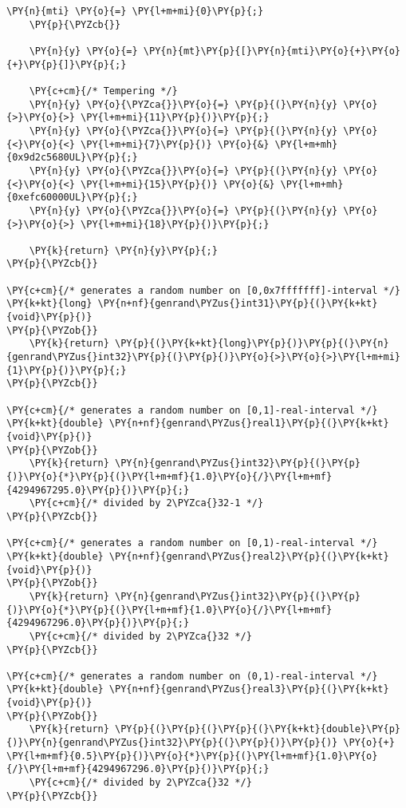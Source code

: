 \begin{Verbatim}[commandchars=\\\{\}]
		\PY{n}{mti} \PY{o}{=} \PY{l+m+mi}{0}\PY{p}{;}
	\PY{p}{\PYZcb{}}
  
	\PY{n}{y} \PY{o}{=} \PY{n}{mt}\PY{p}{[}\PY{n}{mti}\PY{o}{+}\PY{o}{+}\PY{p}{]}\PY{p}{;}

	\PY{c+cm}{/* Tempering */}
	\PY{n}{y} \PY{o}{\PYZca{}}\PY{o}{=} \PY{p}{(}\PY{n}{y} \PY{o}{>}\PY{o}{>} \PY{l+m+mi}{11}\PY{p}{)}\PY{p}{;}
	\PY{n}{y} \PY{o}{\PYZca{}}\PY{o}{=} \PY{p}{(}\PY{n}{y} \PY{o}{<}\PY{o}{<} \PY{l+m+mi}{7}\PY{p}{)} \PY{o}{&} \PY{l+m+mh}{0x9d2c5680UL}\PY{p}{;}
	\PY{n}{y} \PY{o}{\PYZca{}}\PY{o}{=} \PY{p}{(}\PY{n}{y} \PY{o}{<}\PY{o}{<} \PY{l+m+mi}{15}\PY{p}{)} \PY{o}{&} \PY{l+m+mh}{0xefc60000UL}\PY{p}{;}
	\PY{n}{y} \PY{o}{\PYZca{}}\PY{o}{=} \PY{p}{(}\PY{n}{y} \PY{o}{>}\PY{o}{>} \PY{l+m+mi}{18}\PY{p}{)}\PY{p}{;}

	\PY{k}{return} \PY{n}{y}\PY{p}{;}
\PY{p}{\PYZcb{}}

\PY{c+cm}{/* generates a random number on [0,0x7fffffff]-interval */}
\PY{k+kt}{long} \PY{n+nf}{genrand\PYZus{}int31}\PY{p}{(}\PY{k+kt}{void}\PY{p}{)}
\PY{p}{\PYZob{}}
	\PY{k}{return} \PY{p}{(}\PY{k+kt}{long}\PY{p}{)}\PY{p}{(}\PY{n}{genrand\PYZus{}int32}\PY{p}{(}\PY{p}{)}\PY{o}{>}\PY{o}{>}\PY{l+m+mi}{1}\PY{p}{)}\PY{p}{;}
\PY{p}{\PYZcb{}}

\PY{c+cm}{/* generates a random number on [0,1]-real-interval */}
\PY{k+kt}{double} \PY{n+nf}{genrand\PYZus{}real1}\PY{p}{(}\PY{k+kt}{void}\PY{p}{)}
\PY{p}{\PYZob{}}
	\PY{k}{return} \PY{n}{genrand\PYZus{}int32}\PY{p}{(}\PY{p}{)}\PY{o}{*}\PY{p}{(}\PY{l+m+mf}{1.0}\PY{o}{/}\PY{l+m+mf}{4294967295.0}\PY{p}{)}\PY{p}{;} 
	\PY{c+cm}{/* divided by 2\PYZca{}32-1 */} 
\PY{p}{\PYZcb{}}

\PY{c+cm}{/* generates a random number on [0,1)-real-interval */}
\PY{k+kt}{double} \PY{n+nf}{genrand\PYZus{}real2}\PY{p}{(}\PY{k+kt}{void}\PY{p}{)}
\PY{p}{\PYZob{}}
	\PY{k}{return} \PY{n}{genrand\PYZus{}int32}\PY{p}{(}\PY{p}{)}\PY{o}{*}\PY{p}{(}\PY{l+m+mf}{1.0}\PY{o}{/}\PY{l+m+mf}{4294967296.0}\PY{p}{)}\PY{p}{;} 
	\PY{c+cm}{/* divided by 2\PYZca{}32 */}
\PY{p}{\PYZcb{}}

\PY{c+cm}{/* generates a random number on (0,1)-real-interval */}
\PY{k+kt}{double} \PY{n+nf}{genrand\PYZus{}real3}\PY{p}{(}\PY{k+kt}{void}\PY{p}{)}
\PY{p}{\PYZob{}}
	\PY{k}{return} \PY{p}{(}\PY{p}{(}\PY{p}{(}\PY{k+kt}{double}\PY{p}{)}\PY{n}{genrand\PYZus{}int32}\PY{p}{(}\PY{p}{)}\PY{p}{)} \PY{o}{+} \PY{l+m+mf}{0.5}\PY{p}{)}\PY{o}{*}\PY{p}{(}\PY{l+m+mf}{1.0}\PY{o}{/}\PY{l+m+mf}{4294967296.0}\PY{p}{)}\PY{p}{;} 
	\PY{c+cm}{/* divided by 2\PYZca{}32 */}
\PY{p}{\PYZcb{}}


\end{Verbatim}
